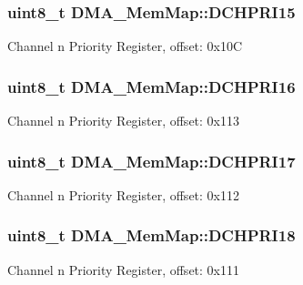 \subsubsection[{D\+C\+H\+P\+R\+I15}]{\setlength{\rightskip}{0pt plus 5cm}uint8\+\_\+t D\+M\+A\+\_\+\+Mem\+Map\+::\+D\+C\+H\+P\+R\+I15}\label{struct_d_m_a___mem_map_a7938c3c5e450351844c5c6630a5191b2}
Channel n Priority Register, offset\+: 0x10\+C \hypertarget{struct_d_m_a___mem_map_af60c241fd440397566335b20911e600e}{}
\subsubsection[{D\+C\+H\+P\+R\+I16}]{\setlength{\rightskip}{0pt plus 5cm}uint8\+\_\+t D\+M\+A\+\_\+\+Mem\+Map\+::\+D\+C\+H\+P\+R\+I16}\label{struct_d_m_a___mem_map_af60c241fd440397566335b20911e600e}
Channel n Priority Register, offset\+: 0x113 \hypertarget{struct_d_m_a___mem_map_a4d83e1d73024969feb88d8f3fd56de2e}{}
\subsubsection[{D\+C\+H\+P\+R\+I17}]{\setlength{\rightskip}{0pt plus 5cm}uint8\+\_\+t D\+M\+A\+\_\+\+Mem\+Map\+::\+D\+C\+H\+P\+R\+I17}\label{struct_d_m_a___mem_map_a4d83e1d73024969feb88d8f3fd56de2e}
Channel n Priority Register, offset\+: 0x112 \hypertarget{struct_d_m_a___mem_map_a2e20ccb575f500f10ffa207bf927aeaf}{}
\subsubsection[{D\+C\+H\+P\+R\+I18}]{\setlength{\rightskip}{0pt plus 5cm}uint8\+\_\+t D\+M\+A\+\_\+\+Mem\+Map\+::\+D\+C\+H\+P\+R\+I18}\label{struct_d_m_a___mem_map_a2e20ccb575f500f10ffa207bf927aeaf}
Channel n Priority Register, offset\+: 0x111 \hypertarget{struct_d_m_a___mem_map_ac298ce8f6e40742ef7731de2ec509717}{}
